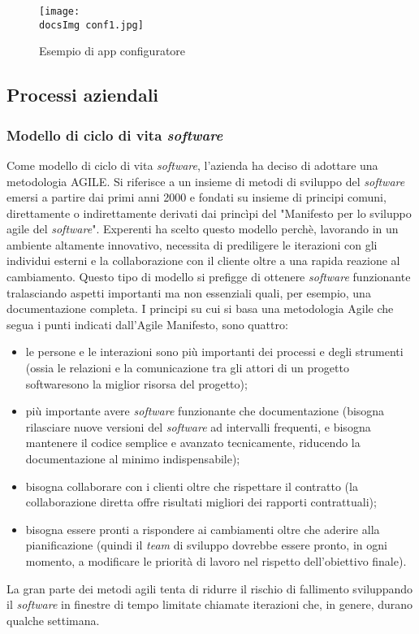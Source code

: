 \begin{figure}[H]
	\centering
	\texttt{[image: \\docsImg conf1.jpg]}
	\caption{Esempio di app configuratore}
	\label{fig:Esempio di app configuratore}
\end{figure}



\subsection{Processi aziendali}
\subsubsection{Modello di ciclo di vita \textit{software\gloss}}
Come modello di ciclo di vita \textit{software\gloss}, l'azienda ha deciso di adottare una metodologia AGILE. Si riferisce a un insieme di metodi di sviluppo del \textit{software\gloss} emersi a partire dai primi anni 2000 e fondati su insieme di principi comuni, direttamente o indirettamente derivati dai princìpi del "Manifesto per lo sviluppo agile del \textit{software\gloss}". Experenti ha scelto questo modello perch\`e, lavorando in un ambiente altamente innovativo, necessita di prediligere le iterazioni con gli individui esterni e la collaborazione con il cliente oltre a una rapida reazione al cambiamento. Questo tipo di modello si prefigge di ottenere \textit{software\gloss} funzionante tralasciando aspetti importanti ma non essenziali quali, per esempio, una documentazione completa.
I principi su cui si basa una metodologia Agile che segua i punti indicati dall'Agile Manifesto, sono quattro:
\begin{itemize}
	\item le persone e le interazioni sono più importanti dei processi e degli strumenti (ossia le relazioni e la comunicazione tra gli attori di un progetto software\gloss sono la miglior risorsa del progetto);
	\item  più importante avere \textit{software\gloss} funzionante che documentazione (bisogna rilasciare nuove versioni del \textit{software\gloss} ad intervalli frequenti, e bisogna mantenere il codice semplice e avanzato tecnicamente, riducendo la documentazione al minimo indispensabile);
	\item bisogna collaborare con i clienti oltre che rispettare il contratto (la collaborazione diretta offre risultati migliori dei rapporti contrattuali);
	\item bisogna essere pronti a rispondere ai cambiamenti oltre che aderire alla pianificazione (quindi il \textit{team} di sviluppo dovrebbe essere pronto, in ogni momento, a modificare le priorità di lavoro nel rispetto dell'obiettivo finale).
\end{itemize}
\noindent
La gran parte dei metodi agili tenta di ridurre il rischio di fallimento sviluppando il \textit{software\gloss} in finestre di tempo limitate chiamate iterazioni che, in genere, durano qualche settimana.

